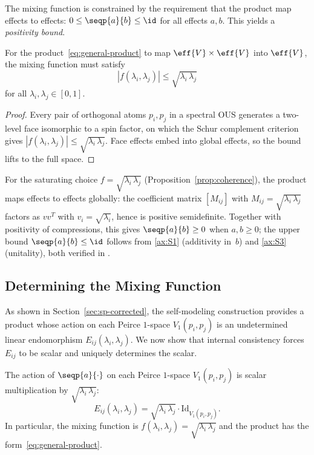 \documentclass[11pt]{article}
\begin{document}
The mixing function is constrained by the requirement that the product
map effects to effects: $0 \leq \seqp{a}{b} \leq \id$ for all effects
$a, b$.  This yields a \emph{positivity bound}.

\begin{proposition}\label{prop:pos-bound}
  For the product~\eqref{eq:general-product} to map
  $\eff{V} \times \eff{V}$ into $\eff{V}$, the mixing function must
  satisfy
  \begin{equation}\label{eq:pos-bound}
    |f(\lambda_{i}, \lambda_{j})| \leq
    \sqrt{\lambda_{i}\, \lambda_{j}}
  \end{equation}
  for all $\lambda_{i}, \lambda_{j} \in [0,1]$.
\end{proposition}

\begin{proof}
  Every pair of orthogonal atoms $p_{i}, p_{j}$ in a spectral OUS
  generates a two-level face isomorphic to a spin factor, on which
  the Schur complement criterion gives
  $|f(\lambda_{i}, \lambda_{j})| \leq \sqrt{\lambda_{i}\,
  \lambda_{j}}$.  Face effects embed into global effects, so the
  bound lifts to the full space.
\end{proof}

For the saturating choice $f = \sqrt{\lambda_i\, \lambda_j}$
(Proposition~\ref{prop:coherence}), the product maps effects to
effects globally: the coefficient matrix
$[M_{ij}]$ with $M_{ij} = \sqrt{\lambda_i\, \lambda_j}$ factors as
$vv^{T}$ with $v_i = \sqrt{\lambda_i}$, hence is positive
semidefinite.  Together with positivity of compressions, this gives
$\seqp{a}{b} \geq 0$ when $a, b \geq 0$; the upper bound
$\seqp{a}{b} \leq \id$ follows from \ref{ax:S1} (additivity in~$b$)
and \ref{ax:S3} (unitality), both verified in .


\subsection{Determining the Mixing Function}
\label{sec:sp-faithful}

As shown in Section~\ref{sec:sp-corrected}, the self-modeling
construction provides a product whose action on each Peirce
$1$-space $V_1(p_i, p_j)$ is an undetermined linear endomorphism
$E_{ij}(\lambda_i, \lambda_j)$.  We now show that internal
consistency forces $E_{ij}$ to be scalar and uniquely
determines the scalar.

\begin{proposition}\label{prop:coherence}
  The action of $\seqp{a}{\cdot}$ on each Peirce $1$-space
  $V_1(p_i, p_j)$ is scalar multiplication by
  $\sqrt{\lambda_i\, \lambda_j}$:
  \begin{equation}\label{eq:faithful-f}
    E_{ij}(\lambda_i, \lambda_j)
    = \sqrt{\lambda_{i}\, \lambda_{j}} \cdot \mathrm{Id}_{V_1(p_i, p_j)}.
  \end{equation}
  In particular, the mixing function is
  $f(\lambda_i, \lambda_j) = \sqrt{\lambda_i\, \lambda_j}$
  and the product has the form~\eqref{eq:general-product}.
\end{proposition}
\end{document}
